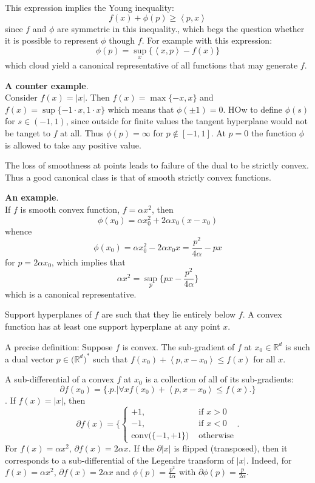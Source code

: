 \documentclass[a4paper]{article}
\newcommand{\brkt}[1]{{\left\langle #1 \right\rangle}}
\newcommand{\Real}{\mathbb{R}}
\begin{document}
This expression implies the Young inequality:
\[f(x) + \phi(p) \geq \brkt{p,x}\]
since $f$ and $\phi$ are symmetric in this inequality., which begs the question whether it is possible to represent $\phi$ though $f$.
For example with this expression:
\[\phi(p) = \sup_x \big\{\brkt{x,p}-f(x)\big\}\]
which cloud yield a canonical representative of all functions that may generate $f$.

\textbf{A counter example}.\hfill \\
Consider $f(x) = \lvert x \rvert$. Then $f(x) = \max\{-x,x\}$ and $f(x) = \sup\{-1\cdot x, 1\cdot x\}$
which means that $\phi(\pm1)=0$. HOw to define $\phi(s)$ for $s\in (-1,1)$, since outside for finite values the tangent hyperplane would not be tanget to $f$ at all. Thus $\phi(p)=\infty$ for $p\notin [-1,1]$. At $p=0$ the function $\phi$ is allowed to take any positive value.

The loss of smoothness at points leads to failure of the dual to be strictly convex.
Thus a good canonical class is that of smooth strictly convex functions.

\textbf{An example}.\hfill \\
If $f$ is smooth convex function, $f=\alpha x^2$, then
\[\phi(x_0) = \alpha x_0^2 + 2\alpha x_0 (x-x_0)\]
whence 
\[\phi(x_0) = \alpha x_0^2 - 2\alpha x_0 x = \frac{p^2}{4 \alpha} - p x\]
for $p = 2\alpha x_0$, which implies that
\[\alpha x^2 = \sup_{p} \big\{ px - \frac{p^2}{4\alpha}\big\}\]
which is a canonical representative.

Support hyperplanes of $f$ are such that they lie entirely below $f$.
A convex function has at least one support hyperplane at any point $x$.

A precise definition:
Suppose $f$ is convex. The sub-gradient of $f$ at $x_0\in \Real^d$ is such a dual vector
$p\in\big(\Real^d)^*$ such that $f(x_0)+\brkt{p, x-x_0}\leq f(x)$ for all $x$.

A sub-differential of a convex $f$ at $x_0$ is a collection of all of its sub-gradients:
\[\partial f(x_0) = \big\{\big. p \big.\big\rvert \forall x f(x_0) + \brkt{p,x-x_0} \leq f(x) \big.\big\}\].
If $f(x) = \lvert x\rvert$, then
\[\partial f(x) = \bigg\{\begin{cases}
	+1, &\text{ if } x>0\\
	-1, &\text{ if } x<0\\
	\text{conv}\big(\{-1,+1\}\big) &\text{ otherwise}
\end{cases}\bigg.\]
For $f(x) = \alpha x^2$, $\partial f(x) = 2\alpha x$.
If the $\partial \lvert x\rvert$ is flipped (transposed), then it corresponds to a sub-differential of the Legendre transform of $\lvert x\rvert$.
Indeed, for $f(x) = \alpha x^2$, $\partial f(x) = 2\alpha x$ and $\phi(p) = \frac{p^2}{4\alpha}$ with $\partial \phi(p) = \frac{p}{2\alpha}$.
\end{document}
